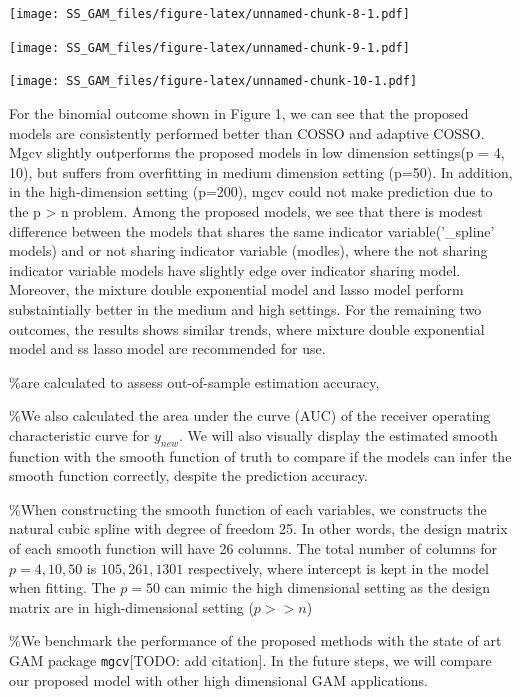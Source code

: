 \documentclass[AMA,STIX1COL,]{WileyNJD-v2}
\begin{document}
\texttt{[image: SS\_GAM\_files/figure-latex/unnamed-chunk-8-1.pdf]}

\texttt{[image: SS\_GAM\_files/figure-latex/unnamed-chunk-9-1.pdf]}

\texttt{[image: SS\_GAM\_files/figure-latex/unnamed-chunk-10-1.pdf]}

For the binomial outcome shown in Figure 1, we can see that the proposed
models are consistently performed better than COSSO and adaptive COSSO.
Mgcv slightly outperforms the proposed models in low dimension
settings(p = 4, 10), but suffers from overfitting in medium dimension
setting (p=50). In addition, in the high-dimension setting (p=200), mgcv
could not make prediction due to the p \textgreater{} n problem. Among
the proposed models, we see that there is modest difference between the
models that shares the same indicator variable('\_spline' models) and or
not sharing indicator variable (modles), where the not sharing indicator
variable models have slightly edge over indicator sharing model.
Moreover, the mixture double exponential model and lasso model perform
substaintially better in the medium and high settings. For the remaining
two outcomes, the results shows similar trends, where mixture double
exponential model and ss lasso model are recommended for use.

\%are calculated to assess out-of-sample estimation accuracy,

\%We also calculated the area under the curve (AUC) of the receiver
operating characteristic curve for \(y_{new}\). We will also visually
display the estimated smooth function with the smooth function of truth
to compare if the models can infer the smooth function correctly,
despite the prediction accuracy.

\%When constructing the smooth function of each variables, we constructs
the natural cubic spline with degree of freedom 25. In other words, the
design matrix of each smooth function will have 26 columns. The total
number of columns for \(p=4, 10, 50\) is \(105, 261, 1301\)
respectively, where intercept is kept in the model when fitting. The
\(p=50\) can mimic the high dimensional setting as the design matrix are
in high-dimensional setting (\(p >> n\))

\%We benchmark the performance of the proposed methods with the state of
art GAM package \texttt{mgcv}{[}TODO: add citation{]}. In the future
steps, we will compare our proposed model with other high dimensional
GAM applications.

~
\end{document}
